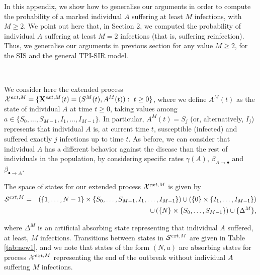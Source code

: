 \documentclass[preprint,12pt]{elsarticle}
\begin{document}
\par In this appendix, we show how to generalise our arguments in order to compute the probability of a marked individual $A$ suffering at least $M$
infections, with $M\geq2$. We point out here that, in Section 2, we computed the probability of individual $A$ suffering at least $M=2$ infections
(that is, suffering reinfection). Thus, we generalise our arguments in previous section for any value $M\geq2$, for the SIS and the general TPI-SIR model.\\

\vspace{0.5cm}

\par{}\\

\par We consider here the extended process ${\cal X}^{ext,M}=\{{\bf X}^{ext,M}(t)=(S^M(t),A^M(t)):\ t\geq0\}$, where we define $A^M(t)$ as the state of
individual $A$ at time $t\geq0$, taking values among $a\in\{S_0,\dots,S_{M-1},I_1,\dots,I_{M-1}\}$. In particular, $A^M(t)=S_j$ (or, alternatively,
$I_j$) represents that individual $A$ is, at current time $t$, susceptible (infected) and suffered exactly $j$ infections up to time $t$. As before, we
can consider that individual $A$ has a different behavior against the disease than the rest of individuals
in the population, by considering specific rates $\gamma(A)$, $\beta_{A\rightarrow\bullet}$ and $\beta_{\bullet\rightarrow A}$.

\par The space of states for our extended process ${\cal X}^{ext,M}$ is given by
\begin{eqnarray*}
 {\cal S}^{ext,M} &=& \left(\{1,\dots,N-1\}\times\{S_0,\dots,S_{M-1},I_1,\dots,I_{M-1}\}\right)\cup\left(\{0\}\times\{I_1,\dots,I_{M-1}\}\right)\\
&&\cup\left(\{N\}\times\{S_0,\dots,S_{M-1}\}\right)\cup\{\Delta^M\},
\end{eqnarray*}
\par\noindent where $\Delta^M$ is an artificial absorbing state representing that individual $A$ suffered, at least, $M$ infections. Transitions
between states in ${\cal S}^{ext,M}$ are given in Table \ref{tab:new1}, and we note that states of the form $(N,a)$ are absorbing states for process ${\cal X}^{ext,M}$
representing the end of the outbreak without individual $A$ suffering $M$ infections.
\end{document}
